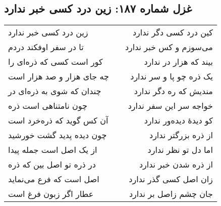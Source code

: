 \begin{center}
\section*{غزل شماره ۱۸۷: زین درد کسی خبر ندارد}
\label{sec:187}
\begin{longtable}{l p{0.5cm} r}
زین درد کسی خبر ندارد
&&
کین درد کسی دگر ندارد
\\
تا در سفر اوفکند دردم
&&
می‌سوزم و کس خبر ندارد
\\
کور است کسی که ذره‌ای را
&&
بیند که هزار در ندارد
\\
چه جای هزار و صد هزار است
&&
یک ذره چو پا و سر ندارد
\\
چندان که شوی به ذره‌ای در
&&
مندیش که ره دگر ندارد
\\
چون نامتناهی است ذره
&&
خواجه سر این سفر ندارد
\\
آن کس گوید که ذره‌خرد است
&&
کو دیدهٔ دیده‌ور ندارد
\\
چون دیده پدید گشت خورشید
&&
از ذره بزرگتر ندارد
\\
از یک اصل است جمله پیدا
&&
اما دل تو نظر ندارد
\\
در ذره تو اصل بین که ذره
&&
از ذره شدن خبر ندارد
\\
اصل است که فرع می‌نماید
&&
زان اصل کسی گذر ندارد
\\
عطار اگر زبون فرغ است
&&
جان چشم زاصل بر ندارد
\\
\end{longtable}
\end{center}
